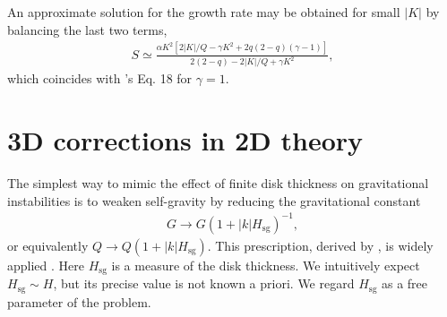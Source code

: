 An approximate solution for the growth rate may be obtained for small
$|K|$ by balancing the last two terms,
\begin{align}
  S \simeq \frac{\alpha K^2\left[2|K|/Q- \gamma K^2 + 
     2q(2-q)(\gamma-1)\right]}{2(2-q)  - 2|K|/Q + \gamma K^2 }, 
\end{align}
which coincides with \citeauthor{gammie96}'s Eq. 18 for $\gamma=1$. 


\section{3D corrections in 2D theory}\label{3dcorr}
The simplest way to mimic the effect of finite disk thickness
on gravitational instabilities is to weaken self-gravity by reducing 
the gravitational constant  
\begin{align}
  G \to G\left(1+|k|H_\mathrm{sg}\right)^{-1}, 
\end{align}
or equivalently $Q\to Q\left(1+|k|H_\mathrm{sg}\right)$. This
prescription, derived by \cite{shu84}, is widely applied
\citep[e.g.][]{youdin11,takahashi14}. Here $H_\mathrm{sg}$ is a
measure of the disk thickness. We intuitively expect
$H_\mathrm{sg}\sim H$, but its precise value is not known a priori.   
We regard $H_\mathrm{sg}$ as a free parameter of the problem.    


